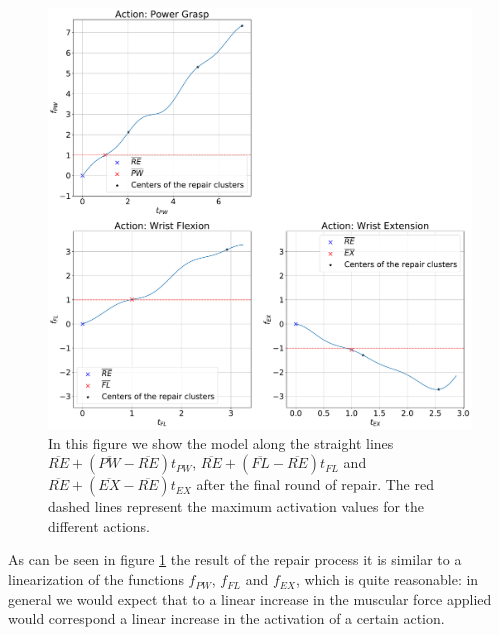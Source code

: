 \begin{figure}[H]
    \centering
    \includegraphics[width=\textwidth]{Images/repair-example/PDO-State3.pdf}
    \caption{In this figure we show the model along the straight lines $\overline{RE} + (\overline{PW} - \overline{RE})t_{PW}$, $\overline{RE} + (\overline{FL} - \overline{RE})t_{FL}$ and $\overline{RE} + (\overline{EX} - \overline{RE})t_{EX}$ after the final round of repair. The red dashed lines represent the maximum activation values for the different actions.}
    \label{fig:PDO-exec-3}
\end{figure}
As can be seen in figure \ref{fig:PDO-exec-3} the result of the repair process it is similar to a linearization of the functions $f_{PW}$, $f_{FL}$ and $f_{EX}$, which is quite reasonable: in general we would expect that to a linear increase in the muscular force applied would correspond a linear increase in the activation of a certain action.
%
%

